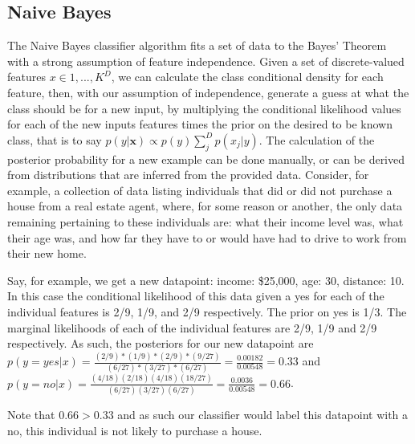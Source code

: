 \subsection{Naive Bayes}
The Naive Bayes classifier algorithm fits a set of data to the Bayes' Theorem with a
strong assumption of feature independence. Given a set of discrete-valued
features $x \in {1,...,K}^D$, we can calculate the class conditional density for
each feature, then, with our assumption of independence, generate a guess
at what the class should be for a new input, by multiplying the conditional
likelihood values for each of the new inputs features times the prior on the
desired to be known class, that is to say
$p(y|\textbf{x}) \propto p(y) \sum_{j}^{D}p(x_j|y)$.
The calculation of the posterior probability for a new example can be done
manually, or can be derived from distributions that are inferred from the
provided data. Consider, for example, a collection of data listing individuals
that did or did not purchase a house from a real estate agent, where, for some
reason or another, the only data remaining pertaining to these individuals are:
what their income level was, what their age was, and how far they have to or
would have had to drive to work from their new home.

Say, for example, we get a new datapoint: income: \$25,000, age: 30, distance: 10. In this
case the conditional likelihood of this data given a yes for each of the
individual features is 2/9, 1/9, and 2/9 respectively. The prior on yes is 1/3.
The marginal likelihoods of each of the individual features are 2/9, 1/9 and 2/9
respectively. As such, the posteriors for our new datapoint are
$p(y=yes|x)=\frac{(2/9)*(1/9)*(2/9)*(9/27)}{(6/27)*(3/27)*(6/27)} = \frac{0.00182}{0.00548} = 0.33$ and $p(y=no|x)=\frac{(4/18)(2/18)(4/18)(18/27)}{(6/27)(3/27)(6/27)} = \frac{0.0036}{0.00548} = 0.66$.

Note that $0.66 > 0.33$ and as such our classifier would label this datapoint
with a no, this individual is not likely to purchase a house.

